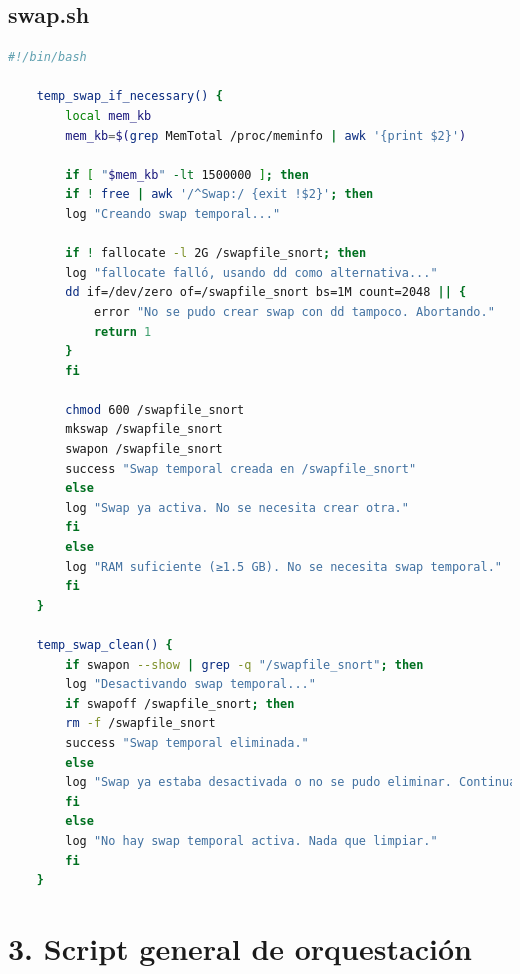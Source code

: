 \documentclass[11pt,a4paper,twoside]{report}
\begin{document}
\subsection*{swap.sh}
\begin{lstlisting}[language=bash, caption={swap.sh}, label={lst:swap-sh}]
	#!/bin/bash
	
	temp_swap_if_necessary() {
		local mem_kb
		mem_kb=$(grep MemTotal /proc/meminfo | awk '{print $2}')
		
		if [ "$mem_kb" -lt 1500000 ]; then
		if ! free | awk '/^Swap:/ {exit !$2}'; then
		log "Creando swap temporal..."
		
		if ! fallocate -l 2G /swapfile_snort; then
		log "fallocate falló, usando dd como alternativa..."
		dd if=/dev/zero of=/swapfile_snort bs=1M count=2048 || {
			error "No se pudo crear swap con dd tampoco. Abortando."
			return 1
		}
		fi
		
		chmod 600 /swapfile_snort
		mkswap /swapfile_snort
		swapon /swapfile_snort
		success "Swap temporal creada en /swapfile_snort"
		else
		log "Swap ya activa. No se necesita crear otra."
		fi
		else
		log "RAM suficiente (≥1.5 GB). No se necesita swap temporal."
		fi
	}
	
	temp_swap_clean() {
		if swapon --show | grep -q "/swapfile_snort"; then
		log "Desactivando swap temporal..."
		if swapoff /swapfile_snort; then
		rm -f /swapfile_snort
		success "Swap temporal eliminada."
		else
		log "Swap ya estaba desactivada o no se pudo eliminar. Continuando."
		fi
		else
		log "No hay swap temporal activa. Nada que limpiar."
		fi
	}
\end{lstlisting}

\section*{3. Script general de orquestación}
\end{document}
